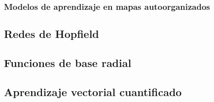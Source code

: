 \subsubsection{Modelos de aprendizaje en mapas autoorganizados}



\subsection{Redes de Hopfield}



\subsection{Funciones de base radial}



\subsection{Aprendizaje vectorial cuantificado}
